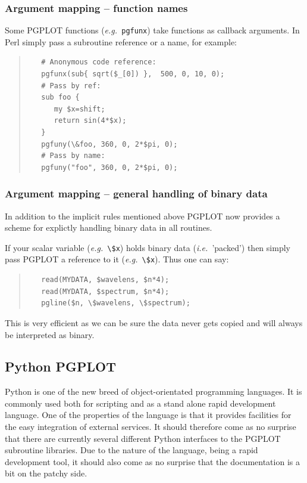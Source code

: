 \documentclass[twoside,11pt]{article}
\newcommand{\htmladdnormallink}[2]{#1}
\newcommand{\xlabel}[1]{}
\begin{document}
\subsubsection{Argument mapping -- function names}

Some PGPLOT functions ({\em e.g.\ }{\tt pgfunx}) take functions as callback arguments. In Perl simply pass a subroutine reference or a name, for example:

\small
\begin{quote}
\begin{verbatim}
   # Anonymous code reference:
   pgfunx(sub{ sqrt($_[0]) },  500, 0, 10, 0);
   # Pass by ref:
   sub foo {
      my $x=shift;
      return sin(4*$x);
   }
   pgfuny(\&foo, 360, 0, 2*$pi, 0);
   # Pass by name:
   pgfuny("foo", 360, 0, 2*$pi, 0);
\end{verbatim}
\end{quote}
\normalsize

\subsubsection{Argument mapping -- general handling of binary data}

In addition to the implicit rules mentioned above PGPLOT now provides a scheme for explictly handling binary data in all routines. 

If your scalar variable ({\em e.g.\ }\verb+\$x+) holds binary data ({\em i.e.\ }'packed') then simply pass PGPLOT a reference to it ({\em e.g.\ }\verb+\$x+). Thus one can say: 

\small
\begin{quote}
\begin{verbatim}
   read(MYDATA, $wavelens, $n*4);
   read(MYDATA, $spectrum, $n*4);
   pgline($n, \$wavelens, \$spectrum);
\end{verbatim}
\end{quote}
\normalsize

This is very efficient as we can be sure the data never gets copied and will always be interpreted as binary. 

\subsection{\xlabel{sc15_pgpython}Python PGPLOT\label{sc15_pgpython}}

Python is one of the new breed of object-orientated programming languages. It is commonly used both for scripting and as a stand alone rapid development language. One of the properties of the language is that it provides facilities for the easy integration of external services. It should therefore come as no surprise that there are currently \htmladdnormallink{several}{http://www.geog.ubc.ca/~phil/ubc_python.html} different Python interfaces to the PGPLOT subroutine libraries. Due to the nature of the language, being a rapid development tool, it should also come as no surprise that the documentation is a bit on the patchy side.
\end{document}
